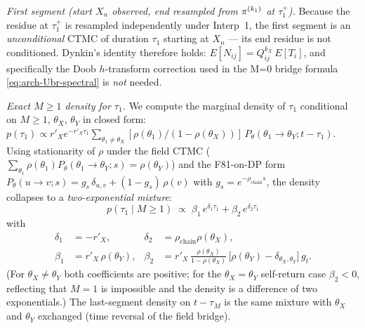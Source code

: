 \emph{First segment (start $X_n$ observed, end resampled from
$\pi^{(k_1)}$ at $\tau_1^+$).} Because the residue at $\tau_1^+$ is
resampled independently under Interp~1, the first segment is an
\emph{unconditional} CTMC of duration $\tau_1$ starting at $X_n$ ---
its end residue is not conditioned. Dynkin's identity therefore holds:
$E[N_{ij}] = Q^{k_X}_{ij}\, E[T_i]$, and specifically the Doob
$h$-transform correction used in the M{=}0 bridge formula
\eqref{eq:arch-Ubr-spectral} is \emph{not} needed.

\emph{Exact $M \geq 1$ density for $\tau_1$.} We compute the marginal
density of $\tau_1$ conditional on $M \geq 1$, $\theta_X$, $\theta_Y$
in closed form:
$p(\tau_1) \propto r'_X e^{-r'_X \tau_1} \sum_{\theta_1 \ne \theta_X}
[\rho(\theta_1) / (1 - \rho(\theta_X))]\, P_\theta(\theta_1 \to \theta_Y;
t - \tau_1)$.
Using stationarity of $\rho$ under the field CTMC
($\sum_{\theta_1} \rho(\theta_1) P_\theta(\theta_1 \to \theta_Y; s) =
\rho(\theta_Y)$) and the F81-on-DP form $P_\theta(u \to v; s) =
g_s\, \delta_{u,v} + (1 - g_s)\, \rho(v)$ with $g_s = e^{-\rho_{\text{chain}} s}$,
the density collapses to a \emph{two-exponential mixture}:
\begin{equation}
  p(\tau_1 \mid M \geq 1) \;\propto\;
    \beta_1\, e^{\delta_1 \tau_1} + \beta_2\, e^{\delta_2 \tau_1}
  \label{eq:arch-tau1-exact}
\end{equation}
with
\begin{align}
  \delta_1 &= -r'_X, & \delta_2 &= \rho_{\text{chain}} \rho(\theta_X), \\
  \beta_1 &= r'_X\, \rho(\theta_Y), &
  \beta_2 &= r'_X\, \tfrac{\rho(\theta_X)}{1 - \rho(\theta_X)}\,
              \bigl[\rho(\theta_Y) - \delta_{\theta_X, \theta_Y}\bigr]\, g_t.
\end{align}
(For $\theta_X \neq \theta_Y$ both coefficients are positive; for the
$\theta_X = \theta_Y$ self-return case $\beta_2 < 0$, reflecting that
$M = 1$ is impossible and the density is a difference of two
exponentials.) The last-segment density on $t - \tau_M$ is the same
mixture with $\theta_X$ and $\theta_Y$ exchanged (time reversal of the
field bridge).

